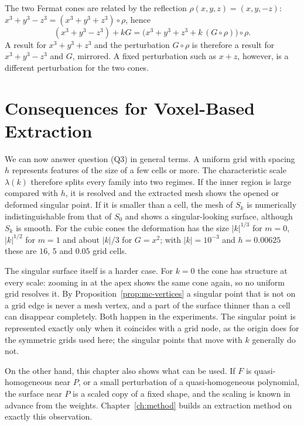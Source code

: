 \documentclass[12pt, a4paper, oneside]{book}
\theoremstyle{plain}
\theoremstyle{definition}
\theoremstyle{remark}
\theoremstyle{definition}
\begin{document}
The two Fermat cones are related by the reflection $\rho(x,y,z)=(x,y,-z)$: $x^3+y^3-z^3=(x^3+y^3+z^3)\circ\rho$, hence
\begin{equation}
\label{eq:reflection}
(x^3+y^3-z^3)+kG=\big(x^3+y^3+z^3+k\,(G\circ\rho)\big)\circ\rho .
\end{equation}
A result for $x^3+y^3+z^3$ and the perturbation $G\circ\rho$ is therefore a result for $x^3+y^3-z^3$ and $G$, mirrored. A fixed perturbation such as $x+z$, however, is a different perturbation for the two cones.

\section{Consequences for Voxel-Based Extraction}
\label{sec:voxel}

We can now answer question (Q3) in general terms. A uniform grid with spacing $h$ represents features of the size of a few cells or more. The characteristic scale $\lambda(k)$ therefore splits every family into two regimes. If the inner region is large compared with $h$, it is resolved and the extracted mesh shows the opened or deformed singular point. If it is smaller than a cell, the mesh of $S_k$ is numerically indistinguishable from that of $S_0$ and shows a singular-looking surface, although $S_k$ is smooth. For the cubic cones the deformation has the size $|k|^{1/3}$ for $m=0$, $|k|^{1/2}$ for $m=1$ and about $|k|/3$ for $G=x^2$; with $|k|=10^{-3}$ and $h=0.00625$ these are $16$, $5$ and $0.05$ grid cells.

The singular surface itself is a harder case. For $k=0$ the cone has structure at every scale: zooming in at the apex shows the same cone again, so no uniform grid resolves it. By Proposition~\ref{prop:mc-vertices} a singular point that is not on a grid edge is never a mesh vertex, and a part of the surface thinner than a cell can disappear completely. Both happen in the experiments. The singular point is represented exactly only when it coincides with a grid node, as the origin does for the symmetric grids used here; the singular points that move with $k$ generally do not.

On the other hand, this chapter also shows what can be used. If $F$ is quasi-homogeneous near $P$, or a small perturbation of a quasi-homogeneous polynomial, the surface near $P$ is a scaled copy of a fixed shape, and the scaling is known in advance from the weights. Chapter~\ref{ch:method} builds an extraction method on exactly this observation.
\end{document}
